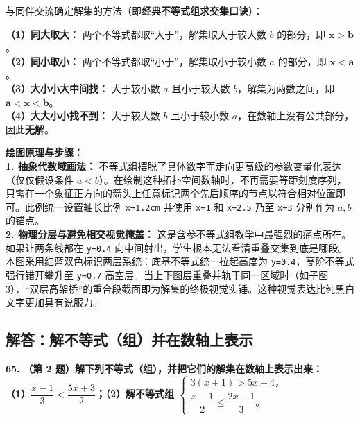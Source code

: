 \vspace{0.4cm}
与同伴交流确定解集的方法（即\textbf{经典不等式组求交集口诀}）：

\textbf{（1）同大取大：} 两个不等式都取“大于”，解集取大于较大数 $b$ 的部分，即 $\boldsymbol{x > b}$。\\
\textbf{（2）同小取小：} 两个不等式都取“小于”，解集取小于较小数 $a$ 的部分，即 $\boldsymbol{x < a}$。\\
\textbf{（3）大小小大中间找：} 大于较小数 $a$ 且小于较大数 $b$，解集为两数之间，即 $\boldsymbol{a < x < b}$。\\
\textbf{（4）大大小小找不到：} 大于较大数 $b$ 且小于较小数 $a$，在数轴上没有公共部分，因此\textbf{无解}。

\vspace{0.4cm}
{\small\color{blue!70!black}
\textbf{绘图原理与步骤：}\\
\textbf{1. 抽象代数域画法：} 不等式组摆脱了具体数字而走向更高级的参数变量化表达（仅仅假设条件 $a < b$）。在绘制这种拓扑空间数轴时，不再需要等距刻度序列，只需在一个象征正方向的箭头上任意标记两个先后顺序的节点以符合相对位置即可。此例统一设置轴长比例 \texttt{x=1.2cm} 并使用 \texttt{x=1} 和 \texttt{x=2.5} 乃至 \texttt{x=3} 分别作为 $a, b$ 的锚点。\\
\textbf{2. 物理分层与避免相交视觉掩盖：} 这是含参不等式组教学中最强烈的痛点所在。如果让两条线都在 \texttt{y=0.4} 向中间射出，学生根本无法看清重叠交集到底是哪段。本图采用红蓝双色标识两层系统：底基不等式统一拉起高度为 \texttt{y=0.4}，高阶不等式强行错开攀升至 \texttt{y=0.7} 高空层。当上下图层重叠并轨于同一区域时（如子图 3），“双层高架桥”的重合段截面即为解集的终极视觉实锤。这种视觉表达比纯黑白文字更加具有说服力。
}

\newpage

\newpage

\subsection{解答：解不等式（组）并在数轴上表示}

\vspace{0.6cm}

\textbf{\LARGE 65.} \textbf{（第 2 题）解下列不等式（组），并把它们的解集在数轴上表示出来：\\[1.5ex]
（1）$\dfrac{x-1}{3} < \dfrac{5x+3}{2}$；\qquad\qquad\qquad\qquad\quad （2）解不等式组 $\begin{cases} 3(x+1) > 5x+4，\\[1ex] \dfrac{x-1}{2} \leqslant \dfrac{2x-1}{3}。 \end{cases}$}

